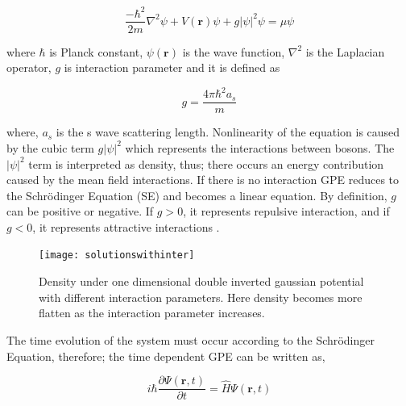 \documentclass[a4paper,times,hidelinks,12pt]{article}
\begin{document}
\begin{equation}
\label{eq:GPE_time_indep}
\frac{-\hbar^2}{2m}\nabla^2\psi + V(\boldsymbol{r})\psi + g|\psi|^2\psi = \mu\psi
\end{equation}

%

\noindent where $\hbar$ is Planck constant, $\psi(\boldsymbol{r})$ is the wave function, $\nabla^2$ is the Laplacian operator, $g$ is interaction parameter and it is defined as 

\begin{equation}
\label{eq:GPE_inter_param}
g=\frac{4\pi\hbar^2a_s}{m}
\end{equation}

\noindent where, $a_s$ is the s wave scattering length. Nonlinearity of the equation is caused by the cubic term $g|\psi|^2$ which represents the interactions between bosons. The $|\psi|^2$ term is interpreted as density, thus; there occurs an energy contribution caused by the mean field interactions. If there is no interaction GPE reduces to the Schr{\"o}dinger Equation (SE) and becomes a linear equation. By definition, $g$ can be positive or negative. If $g > 0$, it represents repulsive interaction, and if $g < 0$, it represents attractive interactions \cite{pitaevskii2016bose}.

\graphicspath{{"../figs/potentials/"}}
\begin{figure}[H]
    \centering
    \texttt{[image: solutionswithinter]}
    \caption{Density under one dimensional double inverted gaussian potential with different interaction parameters. Here density becomes more flatten as the interaction parameter increases.}
\label{fig:gaussian_pot_and_density}
\end{figure}


\noindent The time evolution of the system must occur according to the Schr{\"o}dinger Equation, therefore; the time dependent GPE can be written as,

\begin{equation}
\label{eq:GPE_time_evolution}
i \hbar \frac{\partial\Psi(\boldsymbol{r}, t)}{\partial t} = \hat{H}\Psi(\boldsymbol{r}, t)
\end{equation}
\end{document}
